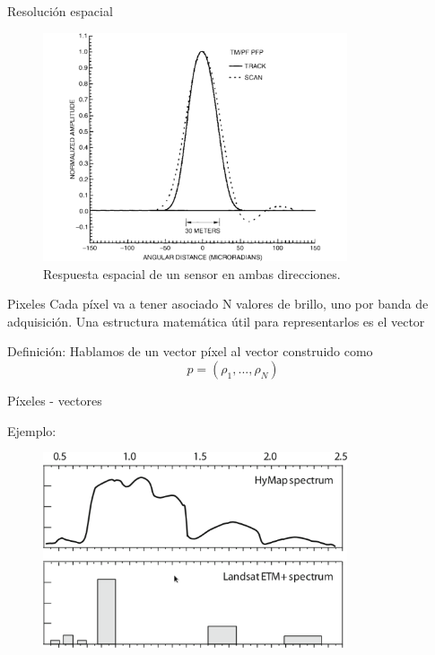 \documentclass[handout]{beamer}
\begin{document}
\begin{frame}{Resolución espacial}
  \begin{figure}
  \centering
  \includegraphics[width=0.8\textwidth]{imagenes/respacial.png}
  \caption{Respuesta espacial de un sensor en ambas direcciones.}
  \end{figure}
\end{frame}

\begin{frame}{Pixeles}
  Cada píxel va a tener asociado N valores de brillo, uno por banda de adquisición. Una estructura matemática útil para representarlos es el vector
  \begin{block}{Definición:}
    Hablamos de un vector píxel al vector construido como
    \begin{equation}
      p = (\rho_1, ... ,\rho_N)
    \end{equation}
  \end{block}
\end{frame}

\begin{frame}{Píxeles - vectores}
  \begin{exampleblock}{Ejemplo:}
    \begin{figure}
      \includegraphics[width=0.8\textwidth]{imagenes/elandsat.png}
    \end{figure}
  \end{exampleblock}
\end{frame}
\end{document}
